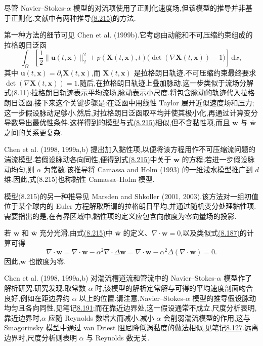 \begin{note}[模型推导概要]
\label{note:navier-stokes-alpha-derivation}
尽管 Navier--Stokes-$\alpha$ 模型的对流项使用了正则化速度场,但该模型的推导并非基于正则化.文献中有两种推导\hyperref[eq:navier-stokes-alpha-model]{(8.215)}的方法.

第一种方法的细节可见 Chen et al. (1999b).它考虑由动能和不可压缩约束组成的拉格朗日泛函
\[
 \int_\Omega\left[
  \frac12\|\bm{u}(t,\bm{x})\|_2^2
  +p(\bm{X}(t,\bm{x}),t)
   \bigl(\det(\nabla\bm{X}(t,\bm{x}))-1\bigr)
 \right]\,\mathrm{d}x,
\]
其中 $\bm{u}(t,\bm{x})=\partial_t\bm{X}(t,\bm{x})$,而 $\bm{X}(t,\bm{x})$ 是拉格朗日轨迹.不可压缩约束最终要求 $\det(\nabla\bm{X}(t,\bm{x}))=1$.随后,在拉格朗日轨迹上叠加脉动.这一步类似于流场分解式\hyperref[eq:les-scale-decomposition]{(8.11)}:拉格朗日轨迹表示平均流场,脉动表示小尺度.将包含脉动的轨迹代入拉格朗日泛函.接下来这个关键步骤是:在泛函中用线性 Taylor 展开近似速度场和压力;这一步假设脉动足够小.然后,对拉格朗日泛函取平均并使其极小化,再通过计算变分导数导出最优性条件.这样得到的模型与式\hyperref[eq:navier-stokes-alpha-model]{(8.215)}相似,但不含黏性项,而且 $\bm{w}$ 与 $\overline{\bm{w}}$ 之间的关系更复杂.

Chen et al. (1998, 1999a,b) 提出加入黏性项,以便将该方程用作不可压缩流问题的湍流模型.若假设脉动各向同性,便得到式\hyperref[eq:navier-stokes-alpha-model]{(8.215)}中关于 $\bm{w}$ 的方程;若进一步假设脉动均匀,则 $\alpha$ 为常数.该推导将 Camassa and Holm (1993) 的一维浅水模型推广到 $d$ 维.因此,式(8.215)也称黏性 Camassa--Holm 模型.

模型(8.215)的另一种推导见 Marsden and Shkoller (2001, 2003).该方法对一组初值位于某个球内的 Euler 方程解取所谓的拉格朗日平均,并通过随机变分处理黏性项.需要指出的是,在有界区域中,黏性项的定义应包含向散度为零向量场的投影.
\end{note}

\begin{note}[散度约束]
\label{note:navier-stokes-alpha-divergence-constraint}
若 $\bm{w}$ 和 $\overline{\bm{w}}$ 充分光滑,由式\hyperref[eq:navier-stokes-alpha-model]{(8.215)}中 $\overline{\bm{w}}$ 的定义、$\nabla\cdot\bm{w}=0$,以及类似式\hyperref[eq:les-adm-divergence-filter-commutation]{(8.187)}的计算可得
\[
 \nabla\cdot\bm{w}
 =\nabla\cdot\overline{\bm{w}}
  -\alpha^2\nabla\cdot\Delta\overline{\bm{w}}
 =\nabla\cdot\overline{\bm{w}}
  -\alpha^2\Delta(\nabla\cdot\overline{\bm{w}})=0.
\]
因此,$\bm{w}$ 也散度为零.
\end{note}

\begin{note}
\label{note:navier-stokes-alpha-channel-pipe}
Chen et al. (1998, 1999a,b) 对湍流槽道流和管流中的 Navier--Stokes-$\alpha$ 模型作了解析研究.研究发现,取常数 $\alpha$ 时,该模型的解析定常解与可得的平均速度剖面吻合良好,例如在距边界约 $\alpha$ 以上的位置.请注意,Navier--Stokes-$\alpha$ 模型的推导假设脉动均匀且各向同性,见笔记\hyperref[note:navier-stokes-alpha-derivation]{8.191};而在靠近边界处,这一假设通常不成立.尺度分析表明,靠近边界时,$\alpha$ 应随 Reynolds 数增大而减小.减小 $\alpha$ 会削弱湍流模型的作用,这与 Smagorinsky 模型中通过 van Driest 阻尼降低涡黏度的做法相似,见笔记\hyperref[note:van-driest-damping]{8.127}.远离边界时,尺度分析则表明 $\alpha$ 与 Reynolds 数无关.
\end{note}

